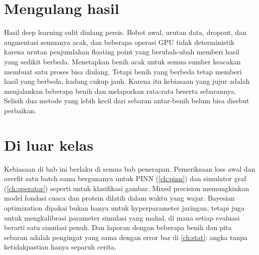\section{Mengulang hasil}

Hasil deep learning sulit diulang persis. Bobot awal, urutan data, dropout, dan augmentasi semuanya acak, dan beberapa operasi
GPU tidak deterministik karena urutan penjumlahan floating point yang berubah-ubah memberi hasil yang sedikit berbeda.
Menetapkan benih acak untuk semua sumber keacakan membuat satu proses bisa diulang. Tetapi benih yang berbeda tetap memberi hasil
yang berbeda, kadang cukup jauh. Karena itu kebiasaan yang jujur adalah menjalankan beberapa benih dan melaporkan rata-rata
beserta sebarannya. Selisih dua metode yang lebih kecil dari sebaran antar-benih belum bisa disebut perbaikan.

\section{Di luar kelas}

Kebiasaan di bab ini berlaku di semua bab penerapan. Pemeriksaan loss awal dan overfit satu batch sama bergunanya untuk PINN
(\cref{ch:pinn}) dan simulator graf (\cref{ch:operator}) seperti untuk klasifikasi gambar. Mixed precision memungkinkan model
fondasi cuaca dan protein dilatih dalam waktu yang wajar. Bayesian optimization dipakai bukan hanya untuk hyperparameter jaringan,
tetapi juga untuk mengkalibrasi parameter simulasi yang mahal, di mana setiap evaluasi berarti satu simulasi penuh. Dan laporan
dengan beberapa benih dan pita sebaran adalah pengingat yang sama dengan error bar di \cref{ch:stat}: angka tanpa
ketidakpastian hanya separuh cerita.

